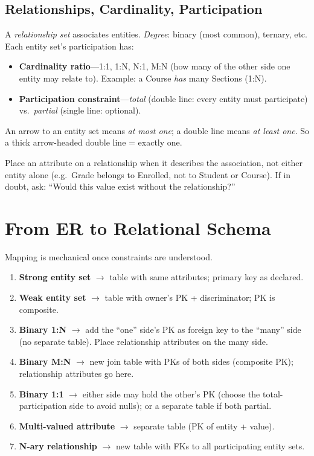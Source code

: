 \subsection{Relationships, Cardinality, Participation}

A \emph{relationship set} associates entities. \emph{Degree}: binary (most common), ternary, etc. Each entity set's participation has:

\begin{itemize}
    \item \textbf{Cardinality ratio}---1:1, 1:N, N:1, M:N (how many of the other side one entity may relate to). Example: a Course \emph{has} many Sections (1:N).
    \item \textbf{Participation constraint}---\emph{total} (double line: every entity must participate) vs.\ \emph{partial} (single line: optional).
\end{itemize}

An arrow to an entity set means \emph{at most one}; a double line means \emph{at least one}. So a thick arrow-headed double line = exactly one.

\begin{remark}
Place an attribute on a relationship when it describes the association, not either entity alone (e.g.\ Grade belongs to Enrolled, not to Student or Course). If in doubt, ask: ``Would this value exist without the relationship?''
\end{remark}

\section{From ER to Relational Schema}
\label{sec:er-to-relational}

Mapping is mechanical once constraints are understood.

\begin{enumerate}
    \item \textbf{Strong entity set} $\to$ table with same attributes; primary key as declared.
    \item \textbf{Weak entity set} $\to$ table with owner's PK + discriminator; PK is composite.
    \item \textbf{Binary 1:N} $\to$ add the ``one'' side's PK as foreign key to the ``many'' side (no separate table). Place relationship attributes on the many side.
    \item \textbf{Binary M:N} $\to$ new join table with PKs of both sides (composite PK); relationship attributes go here.
    \item \textbf{Binary 1:1} $\to$ either side may hold the other's PK (choose the total-participation side to avoid nulls); or a separate table if both partial.
    \item \textbf{Multi-valued attribute} $\to$ separate table (PK of entity + value).
    \item \textbf{N-ary relationship} $\to$ new table with FKs to all participating entity sets.
\end{enumerate}

